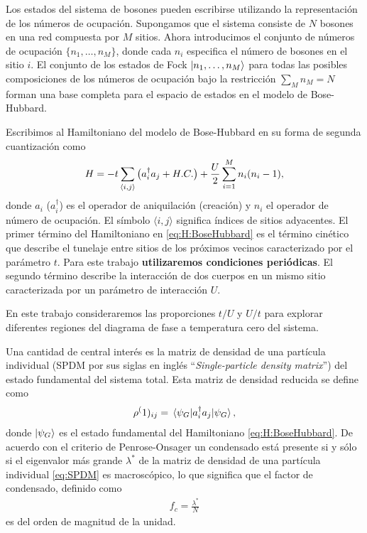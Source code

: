\documentclass[11pt,letterpaper]{article}
\begin{document}
Los estados del sistema de bosones pueden escribirse utilizando
la representación de los números de ocupación. Supongamos que el 
sistema consiste de $N$ bosones en una red compuesta por $M$ sitios.
Ahora introducimos el conjunto de números de ocupación $\{ n_1,\ldots,n_M\}$,
donde cada $n_i$ especifica el número de bosones en el sitio $i$.
El conjunto de los estados de Fock $\ket{n_1,\ldots,n_M}$ para todas
las posibles composiciones de los números de ocupación bajo la 
restricción $\sum_Mn_M=N$ forman una base completa para el espacio de
estados en el modelo de Bose-Hubbard.

Escribimos al Hamiltoniano del modelo de Bose-Hubbard en su forma de 
segunda cuantización como
\begin{align}\label{eq:H:BoseHubbard}
H=-t\sum_{\langle i,j\rangle}\big(a^{\dagger}_{i}a_j+H.C.\big)+
\frac{U}{2}\sum_{i=1}^Mn_i\qty(n_i-1),
\end{align}
donde $a_i$ ($a_i^{\dagger}$) es el operador de aniquilación (creación)
y $n_i$ el operador de número de ocupación. El símbolo $\langle i,j\rangle$
significa índices de sitios adyacentes. El primer término del 
Hamiltoniano en \eqref{eq:H:BoseHubbard} es el término cinético 
que describe el tunelaje entre sitios de los próximos vecinos caracterizado por 
el parámetro $t$. Para este trabajo \textbf{utilizaremos condiciones 
periódicas}. El segundo término describe la interacción de dos cuerpos
en un mismo sitio caracterizada por un parámetro de interacción $U$.

En este trabajo consideraremos las proporciones $t/U$ y $U/t$ para explorar
diferentes regiones del diagrama de fase a temperatura cero del sistema.

Una cantidad de central interés es la matriz de densidad de una partícula
individual (SPDM por sus siglas en inglés ``\textit{Single-particle
density matrix}'') del estado fundamental del sistema total. Esta
matriz de densidad reducida se define como
\begin{align}\label{eq:SPDM}
\rho^(1)_{ij}=\matrixel{\psi_G}{a_i^{\dagger}a_j}{\psi_G},
\end{align}
donde $\ket{\psi_G}$ es el estado fundamental del Hamiltoniano 
\eqref{eq:H:BoseHubbard}.
De acuerdo con el criterio de Penrose-Onsager un condensado está 
presente si y sólo si el eigenvalor más grande $\lambda^*$ de la matriz de densidad 
de una partícula individual \eqref{eq:SPDM} es macroscópico, lo que
significa que el factor de condensado, definido como
\begin{align}\label{eq:fc}
f_c=\frac{\lambda^*}{N}
\end{align}
es del orden de magnitud de la unidad.
\end{document}
